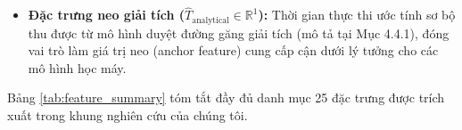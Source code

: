 \documentclass[11pt, a4paper]{article}
\begin{document}
\begin{itemize}
\begin{enumerate}
\begin{equation}
        \end{equation}
        với $\text{dist}_{\mathcal{M}}(q_i, q_j)$ là độ dài đường đi ngắn nhất giữa qubit $q_i$ và $q_j$ trên coupling map của máy $\mathcal{M}$ theo phép gán nhãn qubit ban đầu.
    \end{enumerate}
    \item \textbf{Đặc trưng neo giải tích ($\hat{T}_{\text{analytical}} \in \mathbb{R}^1$):} Thời gian thực thi ước tính sơ bộ thu được từ mô hình duyệt đường găng giải tích (mô tả tại Mục 4.4.1), đóng vai trò làm giá trị neo (anchor feature) cung cấp cận dưới lý tưởng cho các mô hình học máy.
\end{itemize}

Bảng \ref{tab:feature_summary} tóm tắt đầy đủ danh mục 25 đặc trưng được trích xuất trong khung nghiên cứu của chúng tôi.
\end{document}
